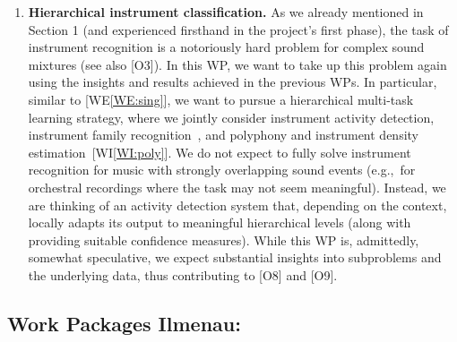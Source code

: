 \documentclass[11pt,a4paper]{article}
\newcommand{\egc}{e.g.,\ }
\theoremstyle{plain} \newtheorem{define}{Definition}[section]
\begin{document}
{\begin{enumerate}[itemindent=0.5cm]
\item  \label{WE:inst}
\textbf{Hierarchical instrument classification.} 
%
As we already mentioned in Section 1 (and experienced firsthand in the project's first phase), the task of instrument recognition is a notoriously hard problem for complex sound mixtures (see also [O3]). In this WP, we want to take up this problem again using the insights and results achieved in the previous WPs. 
%
In particular, similar to [WE\ref{WE:sing}], we want to pursue a hierarchical multi-task learning strategy, where we jointly consider instrument activity detection, instrument family recognition~\cite{TaenzerAMWLM19_InstrumentReco_ISMIR}, and polyphony and instrument density estimation~[WI\ref{WI:poly}].
%
We do not expect to fully solve instrument recognition for music with strongly overlapping sound events (\egc for orchestral recordings where the task may not seem meaningful). Instead, we are thinking of an activity detection system that, depending on the context, locally adapts its output to meaningful hierarchical levels (along with providing suitable confidence measures).
%
While this WP is, admittedly, somewhat speculative, we expect substantial insights into subproblems and the underlying data, thus contributing to [O8] and [O9].
\end{enumerate}

\subsection*{\hspace*{0cm} Work Packages Ilmenau:}

\renewcommand{\labelenumi}{[WI\arabic{enumi}]}

\begin{enumerate}[itemindent=0.5cm]
\setcounter{enumi}{0}


\end{enumerate}}
\end{document}
